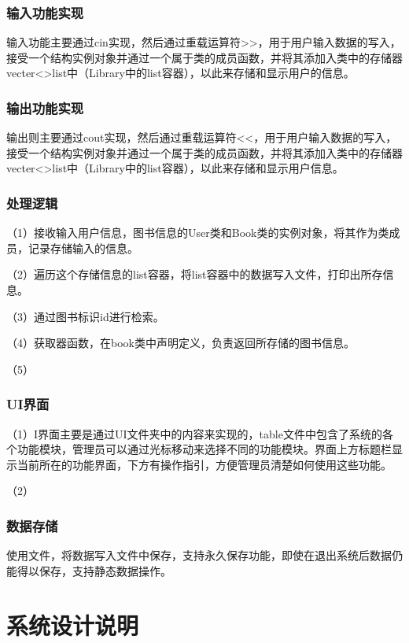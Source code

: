 \documentclass{article}
\begin{document}
\subsubsection{输入功能实现}
输入功能主要通过cin实现，然后通过重载运算符>>，用于用户输入数据的写入，接受一个结构实例对象并通过一个属于类的成员函数，并将其添加入类中的存储器vecter<>list中（Library中的list容器），以此来存储和显示用户的信息。\\
\subsubsection{输出功能实现}
输出则主要通过cout实现，然后通过重载运算符<<，用于用户输入数据的写入，接受一个结构实例对象并通过一个属于类的成员函数，并将其添加入类中的存储器vecter<>list中（Library中的list容器），以此来存储和显示用户信息。\\
\subsubsection{处理逻辑}
（1）接收输入用户信息，图书信息的User类和Book类的实例对象，将其作为类成员，记录存储输入的信息。

（2）遍历这个存储信息的list容器，将list容器中的数据写入文件，打印出所存信息。

（3）通过图书标识id进行检索。

（4）获取器函数，在book类中声明定义，负责返回所存储的图书信息。

（5）\\
\subsubsection{UI界面}

（1）I界面主要是通过UI文件夹中的内容来实现的，table文件中包含了系统的各个功能模块，管理员可以通过光标移动来选择不同的功能模块。界面上方标题栏显示当前所在的功能界面，下方有操作指引，方便管理员清楚如何使用这些功能。

（2）\\%
\subsubsection{数据存储}

使用文件，将数据写入文件中保存，支持永久保存功能，即使在退出系统后数据仍能得以保存，支持静态数据操作。\\
\section{系统设计说明}
\end{document}
